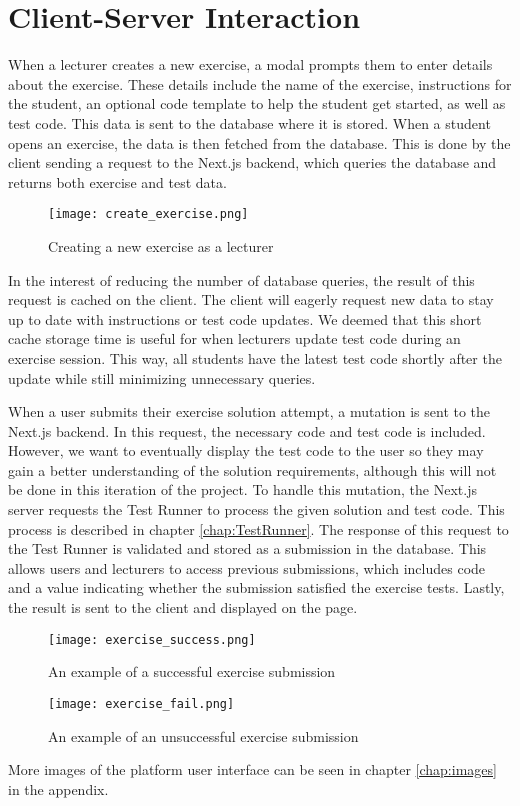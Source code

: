 \section{Client-Server Interaction}
When a lecturer creates a new exercise, a modal prompts them to enter details about the exercise.
These details include the name of the exercise, instructions for the student, an optional code template to help the student get started, as well as test code.
This data is sent to the database where it is stored.
When a student opens an exercise, the data is then fetched from the database.
This is done by the client sending a request to the Next.js backend, which queries the database and returns both exercise and test data.

\begin{figure}[H]
    \centering
    \texttt{[image: create\_exercise.png]}
    \caption{Creating a new exercise as a lecturer}
    \label{fig:create_exercise}
\end{figure}

In the interest of reducing the number of database queries, the result of this request is cached on the client.
The client will eagerly request new data to stay up to date with instructions or test code updates.
We deemed that this short cache storage time is useful for when lecturers update test code during an exercise session.
This way, all students have the latest test code shortly after the update while still minimizing unnecessary queries.

When a user submits their exercise solution attempt, a mutation is sent to the Next.js backend.
In this request, the necessary code and test code is included.
However, we want to eventually display the test code to the user so they may gain a better understanding of the solution requirements, although this will not be done in this iteration of the project.
To handle this mutation, the Next.js server requests the Test Runner to process the given solution and test code.
This process is described in chapter \ref{chap:TestRunner}.
The response of this request to the Test Runner is validated and stored as a submission in the database.
This allows users and lecturers to access previous submissions, which includes code and a value indicating whether the submission satisfied the exercise tests.
Lastly, the result is sent to the client and displayed on the page.

\begin{figure}[H]
	\texttt{[image: exercise\_success.png]}
	\centering
	\caption{An example of a successful exercise submission}
	\label{fig:exercise_success}
\end{figure}

\begin{figure}[H]
	\texttt{[image: exercise\_fail.png]}
	\centering
	\caption{An example of an unsuccessful exercise submission}
	\label{fig:exercise_fail}
\end{figure}

More images of the platform user interface can be seen in chapter \ref{chap:images} in the appendix.
